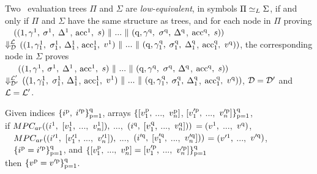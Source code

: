 

\begin{definition}%
\label{def: loweq tree}
Two \piccoC\ evaluation trees $\Pi$ and $\Sigma$ are  \emph{low-equivalent}, in symbols $\Pi \simeq_L \Sigma$, if and only if $\Pi$ and $\Sigma$ have the same structure as trees, and for each node in $\Pi$ proving 
\\ \-\ \quad \-\ $((\mathrm{{1}}, \gamma^{\mathrm{{1}}}_{},$ $\sigma^{\mathrm{{1}}}_{},$ $\Delta^{\mathrm{{1}}}_{}$, $\mathrm{acc}^{\mathrm{{1}}}_{},$ $s)\-\ \Vert\  ...\-\ \Vert\  (\mathrm{{q}}, \gamma^{\mathrm{{q}}}_{},$ $\sigma^{\mathrm{{q}}}_{},$ $\Delta^{\mathrm{{q}}}_{}$, $\mathrm{acc}^{\mathrm{{q}}}_{},$ $s))$ 
\\ $\Downarrow^{\mathcal{L}}_\mathit{\mathcal{D}}$ $((\mathrm{{1}}, \gamma^{\mathrm{{1}}}_{1},$ $\sigma^{\mathrm{{1}}}_{1},$ $\Delta^{\mathrm{{1}}}_{1}$, $\mathrm{acc}^{\mathrm{{1}}}_{1},$ $v^{\mathrm{{1}}}_{})\-\ \Vert\  ...\-\ \Vert\  (\mathrm{{q}}, \gamma^{\mathrm{{q}}}_{1},$ $\sigma^{\mathrm{{q}}}_{1},$ $\Delta^{\mathrm{{q}}}_{1}$, $\mathrm{acc}^{\mathrm{{q}}}_{1},$ $v^{\mathrm{{q}}}_{}))$, the corresponding node in $\Sigma$ proves 
\\ \-\ \quad \-\ \-\ $((\mathrm{{1}}, \gamma^{\mathrm{{1}}}_{},$ $\sigma^{\mathrm{{1}}}_{},$ $\Delta^{\mathrm{{1}}}_{}$, $\mathrm{acc}^{\mathrm{{1}}}_{},$ $s)\-\ \Vert\  ...\-\ \Vert\  (\mathrm{{q}}, \gamma^{\mathrm{{q}}}_{},$ $\sigma^{\mathrm{{q}}}_{},$ $\Delta^{\mathrm{{q}}}_{}$, $\mathrm{acc}^{\mathrm{{q}}}_{},$ $s))$ 
\\ $\Downarrow^{\mathcal{L}'}_\mathit{\mathcal{D}'}$ $((\mathrm{{1}}, \gamma^{\mathrm{{1}}}_{1},$ $\sigma^{\mathrm{{1}}}_{1},$ $\Delta^{\mathrm{{1}}}_{1}$, $\mathrm{acc}^{\mathrm{{1}}}_{1},$ $v^{\mathrm{{1}}}_{})\-\ \Vert\  ...\-\ \Vert\  (\mathrm{{q}}, \gamma^{\mathrm{{q}}}_{1},$ $\sigma^{\mathrm{{q}}}_{1},$ $\Delta^{\mathrm{{q}}}_{1}$, $\mathrm{acc}^{\mathrm{{q}}}_{1},$ $v^{\mathrm{{q}}}_{}))$, $\mathcal{D} = \mathcal{D}'$ and $\mathcal{L} = \mathcal{L}'$.
\end{definition}



\begin{axiom}[$MPC_{ar}$]%
\label{axiom: mpc ar ni}
Given indices $\{i^{\mathrm{{p}}}_{},$ $i'^{\mathrm{{p}}}_{}\}^{\mathrm{{q}}}_{\mathrm{{p}}=\mathrm{{1}}}$, arrays $\{[v^{\mathrm{{p}}}_{1},$ $...,$ $v^{\mathrm{{p}}}_{n}]$, $[v'^{\mathrm{{p}}}_{1},$ $...,$ $v'^{\mathrm{{p}}}_{n}]\}^{\mathrm{{q}}}_{\mathrm{{p}}=\mathrm{{1}}}$, 
\\
if $MPC_{ar}((i^{\mathrm{{1}}}_{},$ $[v^{\mathrm{{1}}}_{1},$ $...,$ $v^{\mathrm{{1}}}_{n}]),$ $...,$ $(i^{\mathrm{{q}}}_{},$ $[v^{\mathrm{{q}}}_{1},$ $...,$ $v^{\mathrm{{q}}}_{n}]))$ $= (v^{\mathrm{{1}}}_{},$ $...,$ $v^{\mathrm{{q}}}_{})$, 
\\ \-\ \-\ 
$MPC_{ar}((i'^{\mathrm{{1}}}_{},$ $[v'^{\mathrm{{1}}}_{1},$ $...,$ $v'^{\mathrm{{1}}}_{n}]),$ $...,$ $(i'^{\mathrm{{q}}}_{},$ $[v'^{\mathrm{{q}}}_{1},$ $...,$ $v'^{\mathrm{{q}}}_{n}]))$ $= (v'^{\mathrm{{1}}}_{},$ $...,$ $v'^{\mathrm{{q}}}_{})$,  
\\ \-\ \-\ 
$\{i^{\mathrm{{p}}}_{} = i'^{\mathrm{{p}}}_{}\}^{\mathrm{{q}}}_{\mathrm{{p}}=\mathrm{{1}}}$, 
and $\{[v^{\mathrm{{p}}}_{1},$ $...,$ $v^{\mathrm{{p}}}_{n}] = [v'^{\mathrm{{p}}}_{1},$ $...,$ $v'^{\mathrm{{p}}}_{n}]\}^{\mathrm{{q}}}_{\mathrm{{p}}=\mathrm{{1}}}$
\\
then $\{v^{\mathrm{{p}}}_{} = v'^{\mathrm{{p}}}_{}\}^{\mathrm{{q}}}_{\mathrm{{p}}=\mathrm{{1}}}$. 
\end{axiom}




